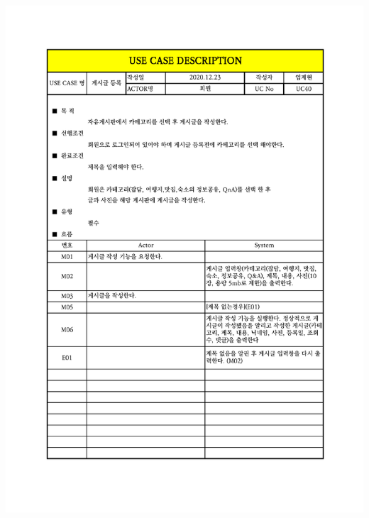 {{{{{{{{{{{{{{{{{{{{{{{{{{{{{{{{{{{{{{{{{{{\includegraphics[width=1.1\textwidth]{./Figure/Design/Display/usecase/040.pdf} \\
}}}}}}}}}}}}}}}}}}}}}}}}}}}}}}}}}}}}}}}}}}}
